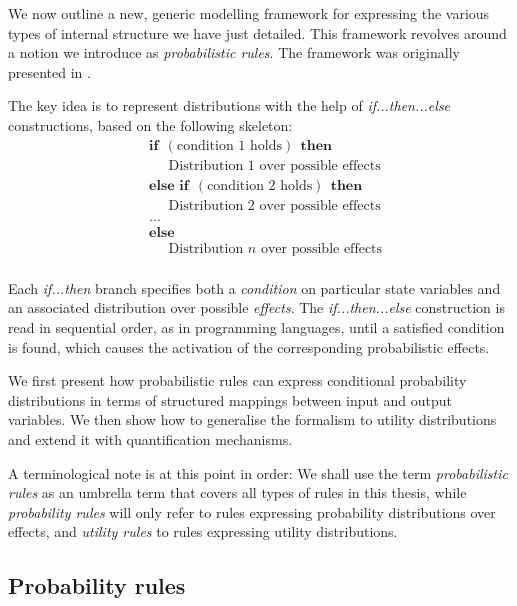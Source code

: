 We now outline a new, generic modelling framework for expressing the various types of internal structure we have just detailed.  This framework revolves around a notion we introduce as \textit{probabilistic rules}. The framework was originally presented in \cite{rulebasedmodels-sigdial2012,lison-semdial2012}.

The key idea is to represent distributions with the help of \textit{if...then...else} constructions, based on the following skeleton:
\begin{equation*}
\begin{aligned}
& \textbf{if} \ \ (\text{condition 1 holds}) \ \ \textbf{then} \\ 
& \;\;\;\;\; \text{Distribution 1 over possible effects} \\
& \textbf{else if} \ \ (\text{condition 2 holds}) \ \ \textbf{then} \\ 
& \;\;\;\;\; \text{Distribution 2 over possible effects} \\
& ... \\
& \textbf{else} \\
& \;\;\;\;\; \text{Distribution } n \text{ over possible effects} \\ 
\end{aligned}
\end{equation*}

Each \textit{if...then} branch specifies both a \textit{condition} on particular state variables and an associated distribution over possible \textit{effects}.   The \textit{if...then...else} construction is read in sequential order, as in programming languages, until a satisfied condition is found, which causes the activation of the corresponding probabilistic effects. 

We first present how probabilistic rules can express conditional probability distributions in terms of structured mappings between input and output variables.  We then show how to  generalise the formalism to utility distributions and extend it with quantification mechanisms.

A terminological note is at this point in order: We shall use the term \textit{probabilistic rules} as an umbrella term that covers all types of rules in this thesis, while \textit{probability rules} will only refer to rules expressing probability distributions over effects, and \textit{utility rules} to rules expressing utility distributions.

\subsection{Probability rules}
\label{sec:probabirules}

